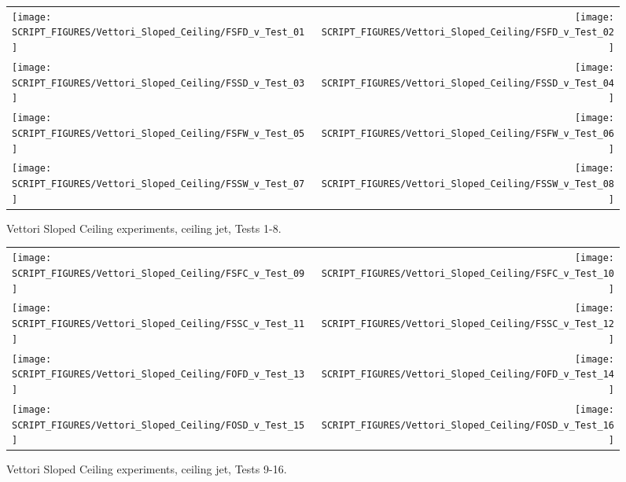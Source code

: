 \newpage

\begin{figure}[p]
\begin{tabular*}{\textwidth}{l@{\extracolsep{\fill}}r}
\texttt{[image: SCRIPT\_FIGURES/Vettori\_Sloped\_Ceiling/FSFD\_v\_Test\_01]} &
\texttt{[image: SCRIPT\_FIGURES/Vettori\_Sloped\_Ceiling/FSFD\_v\_Test\_02]} \\
\texttt{[image: SCRIPT\_FIGURES/Vettori\_Sloped\_Ceiling/FSSD\_v\_Test\_03]} &
\texttt{[image: SCRIPT\_FIGURES/Vettori\_Sloped\_Ceiling/FSSD\_v\_Test\_04]} \\
\texttt{[image: SCRIPT\_FIGURES/Vettori\_Sloped\_Ceiling/FSFW\_v\_Test\_05]} &
\texttt{[image: SCRIPT\_FIGURES/Vettori\_Sloped\_Ceiling/FSFW\_v\_Test\_06]} \\
\texttt{[image: SCRIPT\_FIGURES/Vettori\_Sloped\_Ceiling/FSSW\_v\_Test\_07]} &
\texttt{[image: SCRIPT\_FIGURES/Vettori\_Sloped\_Ceiling/FSSW\_v\_Test\_08]} \\
\end{tabular*}
\caption[Vettori Sloped Ceiling experiments, ceiling jet, Tests 1-8]{Vettori Sloped Ceiling experiments, ceiling jet, Tests 1-8.}
\label{Vettori_Sloped_1}
\end{figure}

\begin{figure}[p]
\begin{tabular*}{\textwidth}{l@{\extracolsep{\fill}}r}
\texttt{[image: SCRIPT\_FIGURES/Vettori\_Sloped\_Ceiling/FSFC\_v\_Test\_09]} &
\texttt{[image: SCRIPT\_FIGURES/Vettori\_Sloped\_Ceiling/FSFC\_v\_Test\_10]} \\
\texttt{[image: SCRIPT\_FIGURES/Vettori\_Sloped\_Ceiling/FSSC\_v\_Test\_11]} &
\texttt{[image: SCRIPT\_FIGURES/Vettori\_Sloped\_Ceiling/FSSC\_v\_Test\_12]} \\
\texttt{[image: SCRIPT\_FIGURES/Vettori\_Sloped\_Ceiling/FOFD\_v\_Test\_13]} &
\texttt{[image: SCRIPT\_FIGURES/Vettori\_Sloped\_Ceiling/FOFD\_v\_Test\_14]} \\
\texttt{[image: SCRIPT\_FIGURES/Vettori\_Sloped\_Ceiling/FOSD\_v\_Test\_15]} &
\texttt{[image: SCRIPT\_FIGURES/Vettori\_Sloped\_Ceiling/FOSD\_v\_Test\_16]} \\
\end{tabular*}
\caption[Vettori Sloped Ceiling experiments, ceiling jet, Tests 9-16]{Vettori Sloped Ceiling experiments, ceiling jet, Tests 9-16.}
\label{Vettori_Sloped_2}
\end{figure}

